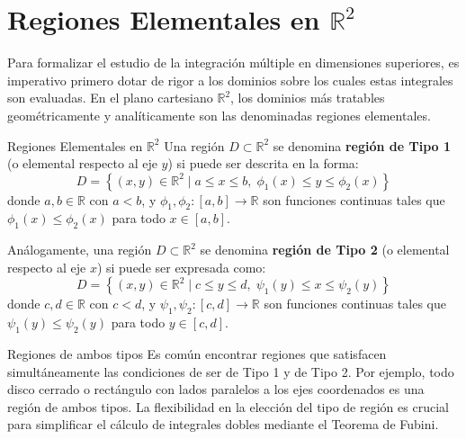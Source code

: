 \documentclass[11pt,a4paper]{article}
\begin{document}
\section{Regiones Elementales en $\mathbb{R}^2$}

Para formalizar el estudio de la integración múltiple en dimensiones superiores, es imperativo primero dotar de rigor a los dominios sobre los cuales estas integrales son evaluadas. En el plano cartesiano $\mathbb{R}^2$, los dominios más tratables geométricamente y analíticamente son las denominadas regiones elementales.

\begin{definicionbox}{Regiones Elementales en $\mathbb{R}^2$}
Una región $D \subset \mathbb{R}^2$ se denomina \textbf{región de Tipo 1} (o elemental respecto al eje $y$) si puede ser descrita en la forma:
\[
D = \left\{ (x,y) \in \mathbb{R}^2 \mid a \leq x \leq b, \; \phi_1(x) \leq y \leq \phi_2(x) \right\}
\]
donde $a, b \in \mathbb{R}$ con $a < b$, y $\phi_1, \phi_2 : [a,b] \to \mathbb{R}$ son funciones continuas tales que $\phi_1(x) \leq \phi_2(x)$ para todo $x \in [a,b]$.

Análogamente, una región $D \subset \mathbb{R}^2$ se denomina \textbf{región de Tipo 2} (o elemental respecto al eje $x$) si puede ser expresada como:
\[
D = \left\{ (x,y) \in \mathbb{R}^2 \mid c \leq y \leq d, \; \psi_1(y) \leq x \leq \psi_2(y) \right\}
\]
donde $c, d \in \mathbb{R}$ con $c < d$, y $\psi_1, \psi_2 : [c,d] \to \mathbb{R}$ son funciones continuas tales que $\psi_1(y) \leq \psi_2(y)$ para todo $y \in [c,d]$.
\end{definicionbox}

\begin{observacionbox}{Regiones de ambos tipos}
Es común encontrar regiones que satisfacen simultáneamente las condiciones de ser de Tipo 1 y de Tipo 2. Por ejemplo, todo disco cerrado o rectángulo con lados paralelos a los ejes coordenados es una región de ambos tipos. La flexibilidad en la elección del tipo de región es crucial para simplificar el cálculo de integrales dobles mediante el Teorema de Fubini.
\end{observacionbox}
\end{document}
